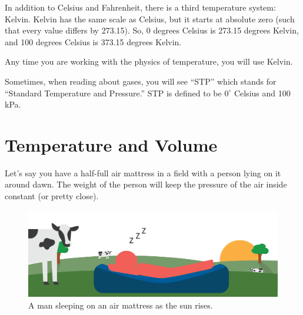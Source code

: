 In addition to Celsius and Fahrenheit, there is a third temperature system: Kelvin. Kelvin has the same scale as Celsius, but it starts at absolute zero (such that every value differs by 273.15).
So, 0 degrees Celsius is 273.15 degrees Kelvin, and 100 degrees Celsius is 373.15 degrees Kelvin.

Any time you are working with the physics of temperature, you will use Kelvin.

Sometimes, when reading about gases, you will see ``STP'' which stands for ``Standard Temperature and Pressure.'' STP is defined to be $0^\circ$ Celsius and 100 kPa.

\section{Temperature and Volume}

Let's say you have a half-full air mattress in a field with a person lying on it around dawn. The weight of the person will keep the pressure of the air inside constant (or pretty close). 
\begin{figure}[htbp]
    \centering
    \includegraphics[width=\textwidth]{airMattress1.png}
    \caption{A man sleeping on an air mattress as the sun rises.}
    \label{fig:airMattress1}
\end{figure}


